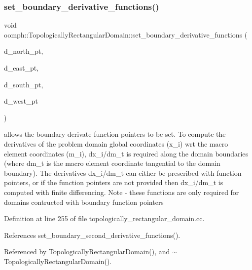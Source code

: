 \subsubsection{\texorpdfstring{set\+\_\+boundary\+\_\+derivative\+\_\+functions()}{set\_boundary\_derivative\_functions()}}
{\footnotesize\ttfamily void oomph\+::\+Topologically\+Rectangular\+Domain\+::set\+\_\+boundary\+\_\+derivative\+\_\+functions (\begin{DoxyParamCaption}\item[{\hyperlink{classoomph_1_1TopologicallyRectangularDomain_a8b2e24f5500d86c93aef509c5410e7cc}{Boundary\+Fct\+Pt}}]{d\+\_\+north\+\_\+pt,  }\item[{\hyperlink{classoomph_1_1TopologicallyRectangularDomain_a8b2e24f5500d86c93aef509c5410e7cc}{Boundary\+Fct\+Pt}}]{d\+\_\+east\+\_\+pt,  }\item[{\hyperlink{classoomph_1_1TopologicallyRectangularDomain_a8b2e24f5500d86c93aef509c5410e7cc}{Boundary\+Fct\+Pt}}]{d\+\_\+south\+\_\+pt,  }\item[{\hyperlink{classoomph_1_1TopologicallyRectangularDomain_a8b2e24f5500d86c93aef509c5410e7cc}{Boundary\+Fct\+Pt}}]{d\+\_\+west\+\_\+pt }\end{DoxyParamCaption})}



allows the boundary derivate function pointers to be set. To compute the derivatives of the problem domain global coordinates (x\+\_\+i) wrt the macro element coordinates (m\+\_\+i), dx\+\_\+i/dm\+\_\+t is required along the domain boundaries (where dm\+\_\+t is the macro element coordinate tangential to the domain boundary). The derivatives dx\+\_\+i/dm\+\_\+t can either be prescribed with function pointers, or if the function pointers are not provided then dx\+\_\+i/dm\+\_\+t is computed with finite differencing. Note -\/ these functions are only required for domains contructed with boundary function pointers 



Definition at line 255 of file topologically\+\_\+rectangular\+\_\+domain.\+cc.



References set\+\_\+boundary\+\_\+second\+\_\+derivative\+\_\+functions().



Referenced by Topologically\+Rectangular\+Domain(), and $\sim$\+Topologically\+Rectangular\+Domain().

\mbox{\label{classoomph_1_1TopologicallyRectangularDomain_a69d21da2d4dff225943aab99fb4f1f10}} 
